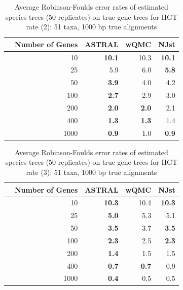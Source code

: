 \begin{table}[h!]
\begin{tabular}{rrrrr}
 & Number of Genes & ASTRAL & wQMC   & NJst\\
\hline
 & 10 & \textbf{10.1} & 10.3 &   \textbf{10.1}\\
 & 25 & 5.9 & 6.0 &   \textbf{5.8} \\
 & 50 & \textbf{3.9} & 4.0 &   4.2\\
 & 100 & \textbf{2.7} & 2.9   & 3.0\\
 & 200 & \textbf{2.0} & \textbf{2.0}   & 2.1\\
 & 400 & \textbf{1.3} & \textbf{1.3}   & 1.4\\
 & 1000 & \textbf{0.9} & 1.0   & \textbf{0.9}\\
\end{tabular}
\caption[Error rates of estimated species trees (50 replicates)  on true gene trees for HGT rate 2]{Average Robinson-Foulds error rates of estimated species trees (50 replicates)  on true gene trees for HGT rate (2): 51 taxa, 1000 bp true alignments}

\label{hgt::table8}
\end{table}

\begin{table}[h!]
\begin{tabular}{rrrrr}
 & Number of Genes & ASTRAL & wQMC  & NJst\\
\hline
 & 10 & \textbf{10.3} & 10.4 &   \textbf{10.3}\\
 & 25 & \textbf{5.0} & 5.3 &   5.1\\
 & 50 & \textbf{3.5} & 3.7 &   \textbf{3.5}\\
 & 100 & \textbf{2.3} & 2.5   & \textbf{2.3} \\
 & 200 & \textbf{1.4} & 1.5   & 1.5\\
 & 400 & \textbf{0.7} & \textbf{0.7}   & 0.9\\
 & 1000 & \textbf{0.4} & 0.5 & 0.5\\
\end{tabular}
\caption[Error rates of estimated species trees (50 replicates)  on true gene trees for HGT rate 3]{Average Robinson-Foulds error rates of estimated species trees (50 replicates) on true gene trees for HGT rate (3): 51 taxa, 1000 bp true alignments}

\label{hgt::table9}
\end{table}


